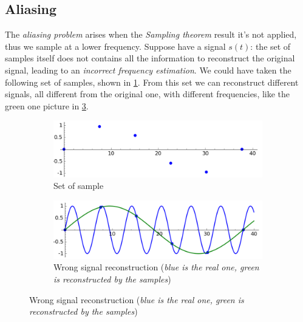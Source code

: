 \documentclass[10pt,a4paper]{report}
\theoremstyle{definition}
\begin{document}
\subsection{Aliasing}\label{sec:aliasing}
The \textit{aliasing problem} arises when the \textit{Sampling theorem} result it's not applied, thus we sample at a lower frequency.
Suppose have a signal $s(t)$: the set of samples itself does not contains all the information to reconstruct the original signal, leading to an \textit{incorrect frequency estimation}.
We could have taken the following set of samples, shown in \ref{sample-eg-1}.
From this set we can reconstruct different signals, all different from the original one, with different frequencies, like the green one picture in \ref{sample-eg-1-reconstruct}.


\begin{figure}[h]
	\centering
	\begin{subfigure}{.5\textwidth}
		\centering
		\includegraphics[width=.9\linewidth]{images/Pasted image 20230526115252.png}
		\caption{Set of sample}
	\label{sample-eg-1}
	\end{subfigure}%
	\begin{subfigure}{.5\textwidth}
		\centering
		\includegraphics[width=.9\linewidth]{images/Pasted image 20230526115356.png}
		\caption{Wrong signal reconstruction (\textit{blue is the real one, green is reconstructed by the samples})}
	\label{sample-eg-1-reconstruct}
	\end{subfigure}


\end{figure}
\end{document}
